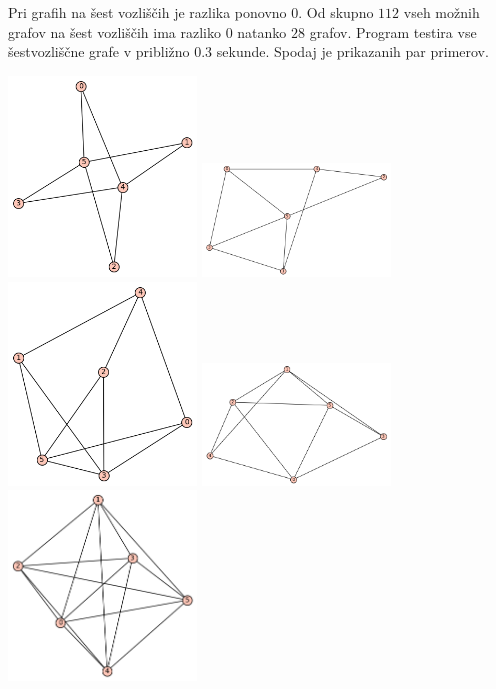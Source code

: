 \documentclass[10pt, a4paper]{article}
\begin{document}
Pri grafih na šest vozliščih je razlika ponovno $0$. Od skupno $112$ vseh možnih grafov na šest vozliščih ima razliko $0$ natanko $28$ grafov. Program testira vse šestvozliščne grafe v približno $0.3$ sekunde. Spodaj je prikazanih par primerov.

\includegraphics[width=5cm]{min_graf_6.1}
\includegraphics[width=5cm]{min_graf_6.2}
\includegraphics[width=5cm]{min_graf_6.3}
\includegraphics[width=5cm]{min_graf_6.4}
\includegraphics[width=5cm]{min_graf_6.5}
\end{document}
